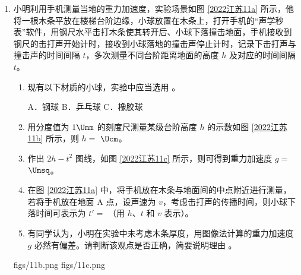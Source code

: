\documentclass[\gkver]{gaokaozhenti}
\begin{document}
\begin{enumerate}
{	当位移为最大位移的一半时有 $F_\text{合}=k\left(x_{1}-\frac{x_{1}-x_{2}}{2}\right)-(mg\sin\theta+f)$，带入 $k$ 值可知 $F_\text{合}=0$，即此时加速度为 0，故 A 错误；

	C．根据 B 的分析可知 $\frac{F}{m_\text{A}+m_\text{B}}=-\frac{F_{AB}}{m_\text{B}}$。再结合 B 选项的结论可知下滑过程中 $F$ 向上且逐渐变大，则下滑过程 $F_{AB}$ 逐渐变大，根据牛顿第三定律可知 B 对 A 的压力逐渐变大，故 C 错误；

	D．整个过程中弹力做的功为 0，A 重力做的功为 0，当 A 回到初始位置时速度为零，根据功能关系可知整个过程中 A、B 克服摩擦力所做的总功等于 B 的重力势能减小量，故 D 错误。

	故选 B。
}

\item
小明利用手机测量当地的重力加速度，实验场景如图 \ref{2022江苏11a} 所示，他将一根木条平放在楼梯台阶边缘，小球放置在木条上，打开手机的“声学秒表”软件，用钢尺水平击打木条使其转开后、小球下落撞击地面，手机接收到钢尺的击打声开始计时，接收到小球落地的撞击声停止计时，记录下击打声与撞击声的时间间隔 $t$，多次测量不同台阶距离地面的高度 $h$ 及对应的时间间隔 $t$。
\begin{enumerate}
	\item
	现有以下材质的小球，实验中应当选用 。

	A．钢球 \qquad B．乒乓球 \qquad C．橡胶球
	\item
	用分度值为 $1\Umm$ 的刻度尺测量某级台阶高度 $h$ 的示数如图 \ref{2022江苏11b} 所示，则 $h =$  $\Ucm$。
	\item
	作出 $2h - t^{2}$ 图线，如图 \ref{2022江苏11c} 所示，则可得到重力加速度 $g =$  $\Umsq$。
	\item
	在图 \ref{2022江苏11a} 中，将手机放在木条与地面间的中点附近进行测量，若将手机放在地面 A 点，设声速为 $v$，考虑击打声的传播时间，则小球下落时间可表示为 $t' =$ （用 $h$、$t$ 和 $v$ 表示）。
	\item
	有同学认为，小明在实验中未考虑木条厚度，用图像法计算的重力加速度 $g$ 必然有偏差。请判断该观点是否正确，简要说明理由 。
\end{enumerate}
{figs/11b.png}
{figs/11c.png}


\end{enumerate}
\end{document}
